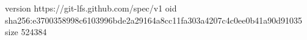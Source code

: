 version https://git-lfs.github.com/spec/v1
oid sha256:e3700358998c6103996bde2a29164a8cc11fa303a4207c4c0ee0b41a90d91035
size 524384
